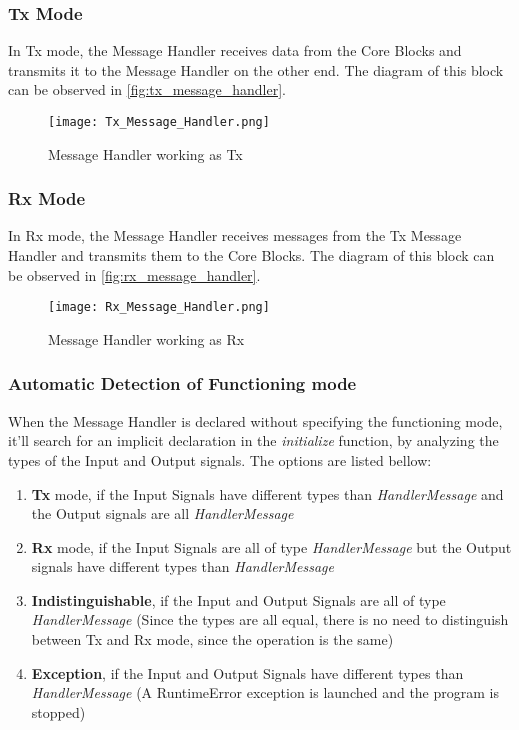 \begin{refsection}
\subsubsection{Tx Mode}
In Tx mode, the Message Handler receives data from the Core Blocks and 
transmits it to the Message Handler on the other end. The diagram of this 
block can be observed in \autoref{fig:tx_message_handler}.
\\
\begin{figure}[H]
	\centering
	\texttt{[image: Tx\_Message\_Handler.png]}
	\caption{Message Handler working as Tx}
	\label{fig:tx_message_handler}
\end{figure}

\subsubsection{Rx Mode}
In Rx mode, the Message Handler receives messages from the Tx Message Handler and 
transmits them to the Core Blocks. The diagram of this block can be observed 
in \autoref{fig:rx_message_handler}.
\\
\begin{figure}[H]
	\centering
	\texttt{[image: Rx\_Message\_Handler.png]}
	\caption{Message Handler working as Rx}
	\label{fig:rx_message_handler}
\end{figure}

\subsubsection{Automatic Detection of Functioning mode}
When the Message Handler is declared without specifying the functioning mode, it'll 
search for an implicit declaration in the \textit{initialize} function, by analyzing
the types of the Input and Output signals. The options are listed bellow:
\begin{enumerate}
	\item \textbf{Tx} mode, if the Input Signals have different types than \textit{HandlerMessage} 
		and the Output signals are all \textit{HandlerMessage}
	\item \textbf{Rx} mode, if the Input Signals are all of type \textit{HandlerMessage} but the 
		Output signals have different types than \textit{HandlerMessage}
	\item \textbf{Indistinguishable}, if the Input and Output Signals are all of type 
		\textit{HandlerMessage} (Since the types are all equal, there is no need 
		to distinguish between Tx and Rx mode, since the operation is the same)
	\item \textbf{Exception}, if the Input and Output Signals have different types 
		than \textit{HandlerMessage} (A RuntimeError exception is launched and the 
		program is stopped)
\end{enumerate}


\end{refsection}
